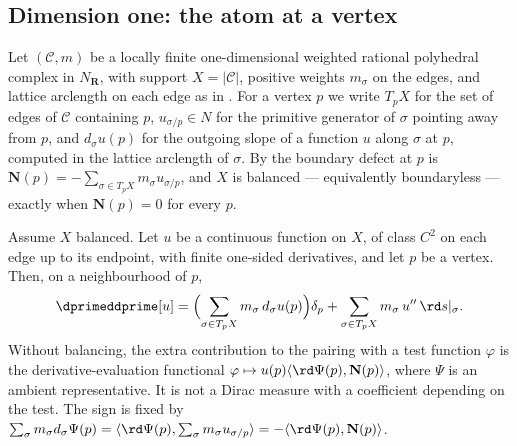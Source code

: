 \subsection{Dimension one: the atom at a vertex}

Let $(\mathscr C,m)$ be a locally finite one-dimensional weighted rational
polyhedral complex in $N_{\mathbf R}$, with support $X=|\mathscr C|$, positive weights
$m_\sigma$ on the edges, and lattice arclength on each edge as in
.  For a vertex $p$ we write $T_pX$ for the
set of edges of $\mathscr C$ containing $p$, $u_{\sigma/p}\in N$ for the
primitive generator of $\sigma$ pointing away from $p$, and $d_\sigma u(p)$
for the outgoing slope of a function $u$ along $\sigma$ at $p$, computed in
the lattice arclength of $\sigma$.  By  the boundary
defect at $p$ is $\mathbf N(p)=-\sum_{\sigma\in T_pX}m_\sigma u_{\sigma/p}$,
and $X$ is balanced --- equivalently boundaryless --- exactly when
$\mathbf N(p)=0$ for every $p$.

\begin{lemma}
\label{lem:ch15-vertex-atom}
Assume $X$ balanced.  Let $u$ be a continuous function on $X$, of class
$C^2$ on each edge up to its endpoint, with finite one-sided derivatives,
and let $p$ be a vertex.  Then, on a neighbourhood of
$p$,
\[
 \dprimeddprime[u]
 =\Bigl(\sum_{\sigma\in T_pX}m_\sigma\,d_\sigma u(p)\Bigr)\delta_p
  +\sum_{\sigma\in T_pX}m_\sigma\,u''\,\rd s|_\sigma .
\]
Without balancing, the extra contribution to the pairing with a test
function $\varphi$ is the derivative-evaluation functional
$\varphi\mapsto u(p)\langle\rd\Psi(p),\mathbf N(p)\rangle$,
where $\Psi$ is an ambient representative.  It is not a Dirac measure
with a coefficient depending on the test.  The
sign is fixed by
$\sum_\sigma m_\sigma d_\sigma\Psi(p)=\langle\rd\Psi(p),\sum_\sigma
m_\sigma u_{\sigma/p}\rangle=-\langle\rd\Psi(p),\mathbf N(p)\rangle$.
\end{lemma}

